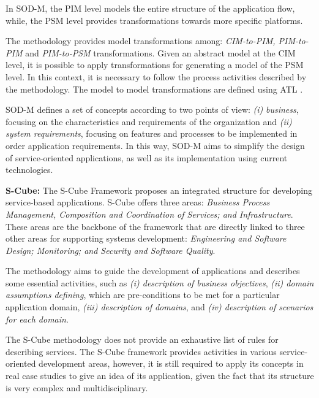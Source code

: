 In SOD-M, the PIM level models the entire structure of the application flow,
while, the PSM level provides transformations towards more specific platforms.

The methodology provides model transformations among:
\textit{CIM-to-PIM, PIM-to-PIM} and \textit{PIM-to-PSM} transformations. Given
an abstract model at the CIM level, it is possible to apply transformations for
generating a model of the PSM level. In this context, it is necessary to
follow the process activities described by the methodology. The model to model
transformations are defined using ATL \cite{atl_manual}.

SOD-M defines a set of concepts according to two points of view:
\textit{(i)} \textit{business}, focusing on the characteristics and requirements
of the organization and \textit{(ii)} \textit{system requirements}, focusing on
features and processes to be implemented in order application requirements. In
this way, SOD-M aims to simplify the design of service-oriented applications, as
well as its implementation using current technologies.

% 
% 



\bigskip

\textbf{S-Cube:} The S-Cube Framework \cite{scube2010book} proposes an
integrated structure for developing service-based applications. S-Cube offers
three areas: \textit{Business Process Management, Composition and Coordination
of Services; and Infrastructure}. These areas are the backbone of the framework
that are directly linked to three other areas for supporting systems
development: \textit{Engineering and Software Design; Monitoring; and Security
and Software Quality}. 

The methodology aims to guide the development of applications and describes
some essential activities, such as \textit{(i) description of business objectives},
\textit{(ii) domain assumptions defining}, which are
pre-conditions to be met for a particular application domain, \textit{(iii)
description of domains}, and \textit{(iv) description of scenarios for
each domain}.

The S-Cube methodology does not provide an exhaustive list of rules for
describing services. The S-Cube framework provides activities in various
service-oriented development areas, however, it is still required to apply its
concepts in real case studies to give an idea of its application, given the fact
that its structure is very complex and multidisciplinary.


